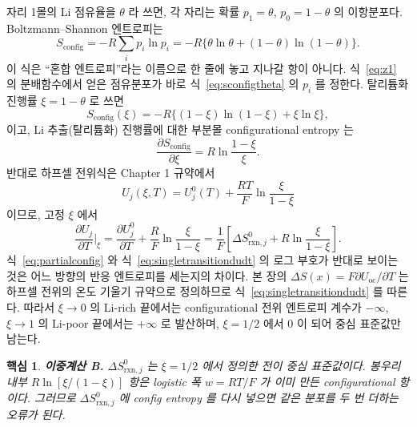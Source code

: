 \documentclass[11pt,a4paper]{article}
\newtheorem*{keybox}{핵심}
\newcommand{\rxn}{\mathrm{rxn}}
\newcommand{\oc}{\mathrm{oc}}
\newcommand{\config}{\mathrm{config}}
\begin{document}
자리 1몰의 Li 점유율을 $\theta$ 라 쓰면, 각 자리는 확률 $p_1=\theta$, $p_0=1-\theta$ 의 이항분포다.
Boltzmann--Shannon 엔트로피는
\begin{equation}
S_{\config}=-R\sum_i p_i\ln p_i
  =-R\{\theta\ln\theta+(1-\theta)\ln(1-\theta)\}.
\label{eq:sconfigtheta}
\end{equation}
이 식은 ``혼합 엔트로피''라는 이름으로 한 줄에 놓고 지나갈 항이 아니다. 식~\eqref{eq:z1} 의
분배함수에서 얻은 점유분포가 바로 식~\eqref{eq:sconfigtheta} 의 $p_i$ 를 정한다. 탈리튬화 진행률
$\xi=1-\theta$ 로 쓰면
\begin{equation}
S_{\config}(\xi)=-R\{(1-\xi)\ln(1-\xi)+\xi\ln\xi\},
\label{eq:sconfigxi}
\end{equation}
이고, Li 추출(탈리튬화) 진행률에 대한 부분몰 configurational entropy 는
\begin{equation}
\frac{\partial S_{\config}}{\partial \xi}
=R\ln\frac{1-\xi}{\xi}.
\label{eq:partialconfig}
\end{equation}
반대로 하프셀 전위식은 Chapter 1 규약에서
\begin{equation}
U_j(\xi,T)=U_j^0(T)+\frac{RT}{F}\ln\frac{\xi}{1-\xi}
\label{eq:singletransitionu}
\end{equation}
이므로, 고정 $\xi$ 에서
\begin{equation}
\frac{\partial U_j}{\partial T}\bigg|_{\xi}
=\frac{\partial U_j^0}{\partial T}+\frac{R}{F}\ln\frac{\xi}{1-\xi}
=\frac{1}{F}\left[\Delta S^0_{\rxn,j}+R\ln\frac{\xi}{1-\xi}\right].
\label{eq:singletransitiondudt}
\end{equation}
식~\eqref{eq:partialconfig} 와 식~\eqref{eq:singletransitiondudt} 의 로그 부호가 반대로 보이는 것은
어느 방향의 반응 엔트로피를 세는지의 차이다. 본 장의 $\Delta S(x)=F\partial U_\oc/\partial T$ 는
하프셀 전위의 온도 기울기 규약으로 정의하므로 식~\eqref{eq:singletransitiondudt} 를 따른다. 따라서
$\xi\to0$ 의 Li-rich 끝에서는 configurational 전위 엔트로피 계수가 $-\infty$, $\xi\to1$ 의 Li-poor 끝에서는
$+\infty$ 로 발산하며, $\xi=1/2$ 에서 0 이 되어 중심 표준값만 남는다.

\begin{keybox}
\textbf{이중계산 B.} $\Delta S^0_{\rxn,j}$ 는 $\xi=1/2$ 에서 정의한 전이 중심 표준값이다. 봉우리 내부
$R\ln[\xi/(1-\xi)]$ 항은 logistic 폭 $w=RT/F$ 가 이미 만든 configurational 항이다. 그러므로
$\Delta S^0_{\rxn,j}$ 에 config entropy 를 다시 넣으면 같은 분포를 두 번 더하는 오류가 된다.
\end{keybox}
\end{document}
